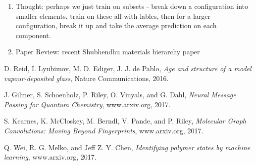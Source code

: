 \documentclass[12pt,reqno]{amsart}
\numberwithin{equation}{section}
\begin{document}
\begin{enumerate}
\item Thought: perhaps we just train on subsets - break down a configuration into smaller elements, train on these all with lables, then for a larger configuration, break it up and take the average prediction on each component.  

\item Paper Review: recent Shubhendhu materials hierarchy paper
\end{enumerate}


\begin{thebibliography}{Al-F11}
D. Reid, I. Lyubimov, M. D. Ediger, J. J. de Pablo, \textit{Age and structure of a model vapour-deposited glass}, Nature Communications, 2016. 

 J. Gilmer, S. Schoenholz, P. Riley, O. Vinyals, and G. Dahl, \textit{Neural Message Passing for Quantum Chemistry}, www.arxiv.org, 2017.  

S. Kearnes, K. McCloskey, M. Berndl, V. Pande, and P. Riley, \textit{Molecular Graph Convolutions: Moving Beyond Fingerprints}, www.arxiv.org, 2017.

Q. Wei, R. G. Melko, and Jeff Z. Y. Chen, \textit{Identifying polymer states by machine learning}, www.arxiv.org, 2017.  

\end{thebibliography}
\end{document}
